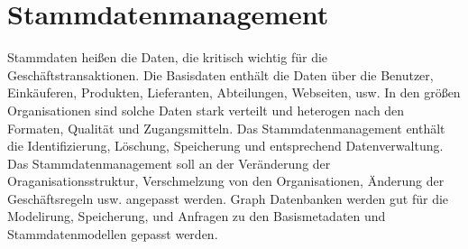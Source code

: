 \section{Stammdatenmanagement}
Stammdaten heißen die Daten, die kritisch wichtig für die Geschäftstransaktionen. Die Basisdaten enthält die Daten über die Benutzer, Einkäuferen, Produkten, Lieferanten, Abteilungen, Webseiten, usw. In den größen Organisationen sind solche Daten stark verteilt und heterogen nach den Formaten, Qualität und Zugangsmitteln. Das Stammdatenmanagement enthält die Identifizierung, Löschung, Speicherung und entsprechend Datenverwaltung. Das Stammdatenmanagement soll an der Veränderung der Oraganisationsstruktur, Verschmelzung von den Organisationen, Änderung der Geschäftsregeln usw. angepasst werden. Graph Datenbanken werden gut für die Modelirung, Speicherung, und Anfragen zu den Basismetadaten und Stammdatenmodellen gepasst werden. 

